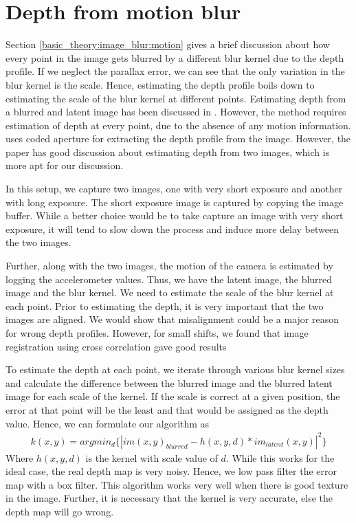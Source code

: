 \documentclass[BTech]{iitmdiss}
\begin{document}
\section{Depth from motion blur}
\label{depth_estimation:motion}
Section \ref{basic_theory:image_blur:motion} gives a brief discussion 
about how every point in the image gets blurred by a different blur 
kernel due to the depth profile. If we neglect the parallax error, we 
can see that the only variation in the blur kernel is the scale. Hence,
estimating the depth profile boils down to estimating the scale of the 
blur kernel at different points. Estimating depth from a blurred and 
latent image has been discussed in \cite{paramanand2010unscented}. However,
the method requires estimation of depth at every point, due to the 
absence of any motion information. \cite{levin2007image} uses coded 
aperture for extracting the depth profile from the image. However, the
paper has good discussion about estimating depth from two images, which
is more apt for our discussion.

In this setup, we capture two images, one with very short exposure and
another with long exposure. The short exposure image is captured by
copying the image buffer. While a better choice would be to take capture
an image with very short exposure, it will tend to slow down the process
and induce more delay between the two images. 

Further, along with the two images, the motion of the camera is 
estimated by logging the accelerometer values. Thus, we have the latent
image, the blurred image and the blur kernel. We need to estimate the 
scale of the blur kernel at each point. Prior to estimating the depth,
it is very important that the two images are aligned. We would show that
misalignment could be a major reason for wrong depth profiles. However,
for small shifts, we found that image registration using cross 
correlation gave good results

To estimate the depth at each point, we iterate through various blur
kernel sizes and calculate the difference between the blurred image and
the blurred latent image for each scale of the kernel. If the scale is
correct at a given position, the error at that point will be the least
and that would be assigned as the depth value. Hence, we can formulate
our algorithm as
\begin{align*}
k(x,y) = argmin_d\{|im(x,y)_{blurred}-h(x,y,d)*im_{latent}(x,y)|^2\}
\end{align*}
Where $h(x,y,d)$ is the kernel with scale value of $d$. While this works
for the ideal case, the real depth map is very noisy. Hence, we low pass
filter the error map with a box filter. This algorithm works very well
when there is good texture in the image. Further, it is necessary that
the kernel is very accurate, else the depth map will go wrong. 
\end{document}
